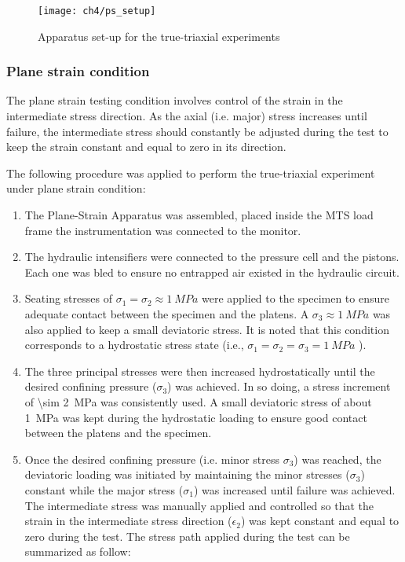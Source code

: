\begin{figure}[tb]
    \centering
    \texttt{[image: ch4/ps\_setup]}
    \caption{Apparatus set-up for the true-triaxial experiments}
    \label{fig4:8}
\end{figure} 

\subsubsection{Plane strain condition}

The plane strain testing condition involves control of the strain in the intermediate stress direction. As the axial (i.e. major) stress increases until failure, the intermediate stress should constantly be adjusted during the test to keep the strain constant and equal to zero in its direction.

The following procedure was applied to perform the true-triaxial experiment under plane strain condition:  

\begin{enumerate}
    \item The Plane-Strain Apparatus was assembled, placed inside the MTS load frame the instrumentation was connected to the monitor.
    \item The hydraulic intensifiers were connected to the pressure cell and the pistons. Each one was bled to ensure no entrapped air existed in the hydraulic circuit. 
    \item Seating stresses of $\sigma_1 = \sigma_2 \approx \SI{1}{MPa}$ were applied to the specimen to ensure adequate contact between the specimen and the platens. A $\sigma_3 \approx \SI{1}{MPa}$ was also applied to keep a small deviatoric stress. It is noted that this condition corresponds to a hydrostatic stress state (i.e., $\sigma_1 = \sigma_2 = \sigma_3 = \SI{1}{MPa}$ ).
    \item The three principal stresses were then increased hydrostatically until the desired confining pressure ($\sigma_3$) was achieved. In so doing, a stress increment of \SI{\sim 2}{MPa} was consistently used. A small deviatoric stress of about \SI{1}{MPa} was kept during the hydrostatic loading to ensure good contact between the platens and the specimen.
    \item Once the desired confining pressure (i.e. minor stress $\sigma_3$) was reached, the deviatoric loading was initiated by maintaining the minor stresses ($\sigma_3$) constant while the major stress ($\sigma_1$) was increased until failure was achieved. The intermediate stress was manually applied and controlled so that the strain in the intermediate stress direction ($\epsilon_2$) was kept constant and equal to zero during the test.  The stress path applied during the test can be summarized as follow:
\end{enumerate}

